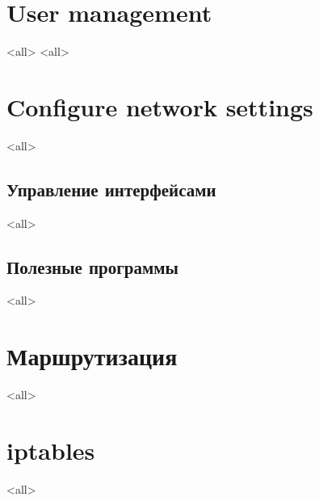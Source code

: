 \section{User management}
\mode<all>{}
\mode<all>{}

\section{Configure network settings}
\mode<all>{}

\subsection{Управление интерфейсами}
\mode<all>{}

\subsection{Полезные программы}
\mode<all>{}

\section{Маршрутизация}
\mode<all>{}

\section{iptables}
\mode<all>{}


